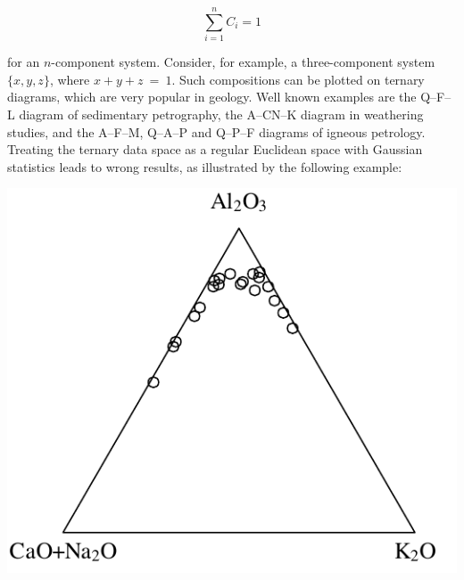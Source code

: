 \[
\sum_{i=1}^n C_i = 1
\]

for an $n$-component system. Consider, for example, a three-component
system $\{x,y,z\}$, where $x+y+z~=~1$. Such compositions can be
plotted on ternary diagrams, which are very popular in geology.  Well
known examples are the Q--F--L diagram of sedimentary petrography, the
A--CN--K diagram in weathering studies, and the A--F--M, Q--A--P and
Q--P--F diagrams of igneous petrology. Treating the ternary data space
as a regular Euclidean space with Gaussian statistics leads to wrong
results, as illustrated by the following example:

\noindent\begin{minipage}[t][][b]{.4\textwidth}
\includegraphics[width=\textwidth]{../figures/ACNK.pdf}\\
\end{minipage}
\begin{minipage}[t][][t]{.6\textwidth}
  \label{fig:ACNK}
\end{minipage}

